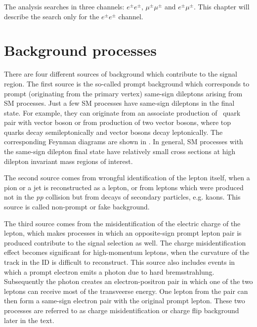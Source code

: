 The analysis searches in three channels: $e^{\pm}e^{\pm}$, $\mu^{\pm}\mu^{\pm}$ and $e^{\pm}\mu^{\pm}$.
This chapter will describe the search only for the $e^{\pm}e^{\pm}$ channel.

\section{Background processes}
\label{sec:wprimeBackgrounds}

There are four different sources of background which contribute to the signal region.
The first source is the so-called prompt background which corresponds to prompt (originating from the primary vertex) same-sign dileptons arising from SM processes.
Just a few SM processes have same-sign dileptons in the final state. 
For example, they can originate from an associate production of \ttbar~quark pair with vector boson or from production of two vector bosons,
where top quarks decay semileptonically and vector bosons decay leptonically.
The corresponding Feynman diagrams are shown in .
In general, SM processes with the same-sign dilepton final state have relatively small cross sections at high dilepton invariant mass regions of interest.

The second source comes from wrongful identification of the lepton itself, when a pion or a jet is reconstructed as a lepton, or from leptons which were produced 
not in the \textit{pp} collision but from decays of secondary particles, e.g. kaons. This source is called non-prompt or fake background.

The third source comes from the misidentification of the electric charge of the lepton, which makes processes in which an opposite-sign prompt lepton pair is produced 
contribute to the signal selection as well. The charge misidentification effect becomes significant for high-momentum leptons, when the curvature of the track in the ID is difficult to reconstruct. 
This source also includes events in which a prompt electron emits a photon due to hard bremsstrahlung. Subsequently the photon creates an electron-positron pair in which one of the two leptons can receive most of the transveerse energy.
One lepton from the pair can then form a same-sign electron pair with the original prompt lepton. These two processes are referred to as charge misidentification or charge flip
background later in the text.

